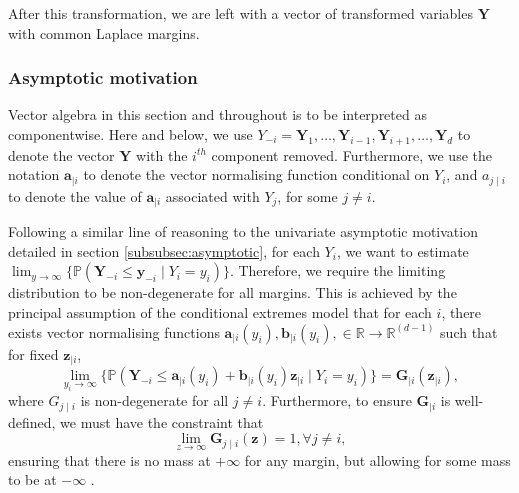 \documentclass{article}
\numberwithin{equation}{section}
\begin{document}
After this transformation, we are left with a vector of transformed variables $\bm{Y}$ with common Laplace margins. 

\subsubsection{Asymptotic motivation}

Vector algebra in this section and throughout is to be interpreted as componentwise.
Here and below, we use $Y_{-i} = {\bm{Y}_1, \ldots, \bm{Y}_{i-1}, \bm{Y}_{i+1}, \ldots, \bm{Y}_d}$ to denote the vector $\bm{Y}$ with the $i^{th}$ component removed. 
Furthermore, we use the notation $\bm{a}_{\mid i}$ to denote the vector normalising function conditional on $Y_i$, and $a_{j \mid i}$ to denote the value of $\bm{a}_{\mid i}$ associated with $Y_j$, for some $j \ne i$. 

Following a similar line of reasoning to the univariate asymptotic motivation detailed in section \ref{subsubsec:asymptotic}, for each $Y_i$, we want to estimate $\lim_{y \to \infty}\{\mathbb{P}(\bm{Y}_{-i} \le \bm{y}_{-i} \mid Y_i = y_i)\}$. 
Therefore, we require the limiting distribution to be non-degenerate for all margins.
This is achieved by the principal assumption of the conditional extremes model that for each $i$, there exists vector normalising functions $\bm{a}_{\mid i}(y_i),\bm{b}_{\mid i}(y_i), \in \mathbb{R} \rightarrow \mathbb{R}^{(d-1)}$ such that for fixed $\bm{z}_{\mid i}$,
\begin{equation} \label{eq:ce_limiting_dist}
      \lim_{y_i \rightarrow \infty}\{\mathbb{P}(\bm{Y}_{-i} \le \bm{a}_{\mid i}(y_i) + \bm{b}_{\mid i}(y_i)\bm{z}_{\mid i} \mid Y_i = y_i)\} = \bm{G}_{\mid i}(\bm{z}_{\mid i}),
\end{equation}
where $G_{j \mid i}$ is non-degenerate for all $j \ne i$. 
Furthermore, to ensure $\bm{G}_{\mid i}$ is well-defined, we must have the constraint that 
\[
  \lim_{z \rightarrow \infty}{\bm{G}_{j \mid i}(\bm{z})} = 1, \forall j \ne i,
\]
ensuring that there is no mass at $+\infty$ for any margin, but allowing for some mass to be at $-\infty$ \cite{Keef2013}. 
\end{document}
